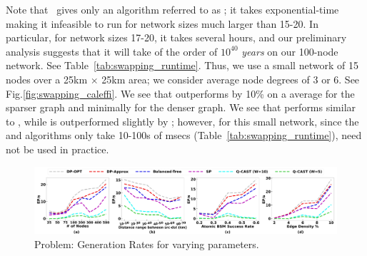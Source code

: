 Note that~\cite{caleffi} gives only an \spp algorithm referred to as
\clf; it takes
exponential-time making it infeasible to run for
network sizes much larger than 15-20. In particular, for network sizes
17-20, it takes several hours, and our preliminary analysis suggests that
it will take of the order of $10^{40}$ \textit{years} on our 100-node
network. See Table~\ref{tab:swapping_runtime}.
Thus, we use a small network of 15 nodes over a 25km $\times$ 25km area;
we consider average node degrees of 3 or 6. See Fig.\ref{fig:swapping_caleffi}.
We see that \dpo outperforms \clf by 10\% on a average for the sparser
graph and minimally for the denser graph. 
We see that \dpa performs similar to \dpo,
while \dpalt is outperformed slightly by \clf; however, for this small
network, since the \dpo and \dpa algorithms only take 10-100s of
msecs (Table~\ref{tab:swapping_runtime}), \dpalt need not be used in practice.  



\begin{figure}[t]
    \centering
    \includegraphics[width=\textwidth]{chapters/swappingtrees/figures/QNR-SP.jpg}
    \caption{\spp Problem: \eps Generation Rates for varying parameters.}
    \label{fig:swapping_spp}
\end{figure}

